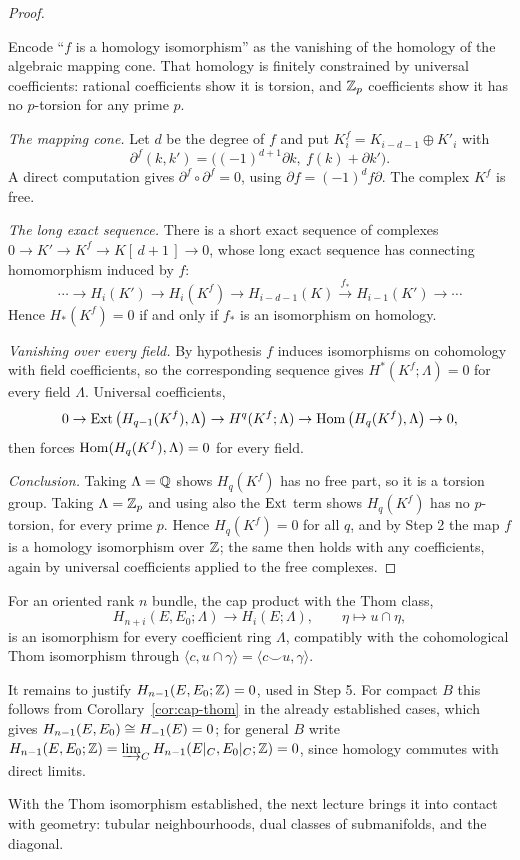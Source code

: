 \begin{proof}
\begin{strategy}
Encode ``$f$ is a homology isomorphism'' as the vanishing of the homology of the
algebraic mapping cone. That homology is finitely constrained by universal
coefficients: rational coefficients show it is torsion, and $\mathbb{Z}_p$ coefficients
show it has no $p$-torsion for any prime $p$.
\end{strategy}

 \emph{The mapping cone.} Let $d$ be the degree of $f$ and put
$K^f_i=K_{i-d-1}\oplus K'_i$ with
\[
\partial^f(k,k')=\big((-1)^{d+1}\partial k,\ f(k)+\partial k'\big).
\]
A direct computation gives $\partial^f\circ\partial^f=0$, using
$\partial f=(-1)^d f\partial$. The complex $K^f$ is free.

 \emph{The long exact sequence.} There is a short exact sequence of
complexes $0\to K'\to K^f\to K[\,d+1\,]\to0$, whose long exact sequence has
connecting homomorphism induced by $f$:
\[
\cdots\to H_i(K')\to H_i(K^f)\to H_{i-d-1}(K)
\xrightarrow{\ f_*\ }H_{i-1}(K')\to\cdots
\]
Hence $H_*(K^f)=0$ if and only if $f_*$ is an isomorphism on homology.

 \emph{Vanishing over every field.} By hypothesis $f$ induces
isomorphisms on cohomology with field coefficients, so the corresponding
sequence gives $H^*(K^f;\Lambda)=0$ for every field $\Lambda$. Universal
coefficients,
\[
0\to\operatorname{Ext}\big(H_{q-1}(K^f),\Lambda\big)\to H^q(K^f;\Lambda)\to
\operatorname{Hom}\big(H_q(K^f),\Lambda\big)\to0,
\]
then forces $\operatorname{Hom}(H_q(K^f),\Lambda)=0$ for every field.

 \emph{Conclusion.} Taking $\Lambda=\mathbb{Q}$ shows $H_q(K^f)$ has no free
part, so it is a torsion group. Taking $\Lambda=\mathbb{Z}_p$ and using also the $\operatorname{Ext}$
term shows $H_q(K^f)$ has no $p$-torsion, for every prime $p$. Hence
$H_q(K^f)=0$ for all $q$, and by Step 2 the map $f$ is a homology isomorphism
over $\mathbb{Z}$; the same then holds with any coefficients, again by universal
coefficients applied to the free complexes.
\end{proof}

\begin{corollary}\label{cor:cap-thom}
For an oriented rank $n$ bundle, the cap product with the Thom class,
\[
H_{n+i}(E,E_0;\Lambda)\longrightarrow H_i(E;\Lambda),
\qquad
\eta\longmapsto u\cap\eta,
\]
is an isomorphism for every coefficient ring $\Lambda$, compatibly with the
cohomological Thom isomorphism through
$\langle c,u\cap\gamma\rangle=\langle c\smile u,\gamma\rangle$.
\end{corollary}

\begin{remark}
It remains to justify $H_{n-1}(E,E_0;\mathbb{Z})=0$, used in Step 5. For compact $B$
this follows from Corollary~\ref{cor:cap-thom} in the already established cases,
which gives $H_{n-1}(E,E_0)\cong H_{-1}(E)=0$; for general $B$ write
$H_{n-1}(E,E_0;\mathbb{Z})=\varinjlim_C H_{n-1}(E|_C,E_0|_C;\mathbb{Z})=0$, since homology
commutes with direct limits.
\end{remark}

With the Thom isomorphism established, the next lecture brings it into contact
with geometry: tubular neighbourhoods, dual classes of submanifolds, and the
diagonal.
